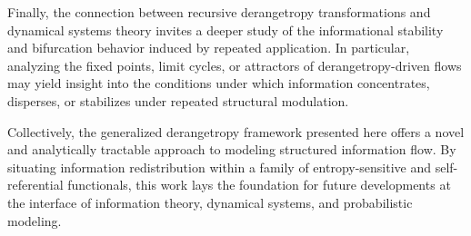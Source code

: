 \documentclass[sn-mathphys-num]{sn-jnl}%
\theoremstyle{thmstyleone}%
\theoremstyle{thmstyletwo}%
\theoremstyle{thmstylethree}%
\begin{document}
Finally, the connection between recursive derangetropy transformations and dynamical systems theory invites a deeper study of the informational stability and bifurcation behavior induced by repeated application. In particular, analyzing the fixed points, limit cycles, or attractors of derangetropy-driven flows may yield insight into the conditions under which information concentrates, disperses, or stabilizes under repeated structural modulation.

Collectively, the generalized derangetropy framework presented here offers a novel and analytically tractable approach to modeling structured information flow. By situating information redistribution within a family of entropy-sensitive and self-referential functionals, this work lays the foundation for future developments at the interface of information theory, dynamical systems, and probabilistic modeling.




\appendix
\end{document}
